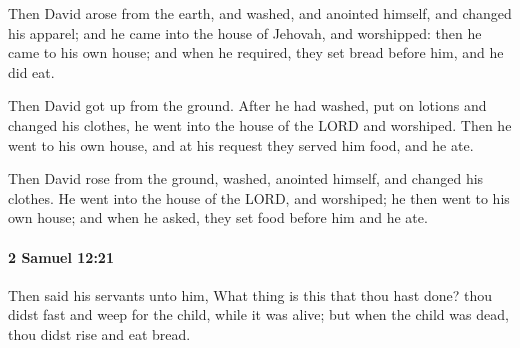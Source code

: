 			\begin{versebox}
					\item[BHS] 
					\item[ASV] Then David arose from the earth, and washed, and anointed himself, and changed his apparel; and he came into the house of Jehovah, and worshipped: then he came to his own house; and when he required, they set bread before him, and he did eat.
					\item[NIV] Then David got up from the ground. After he had washed, put on lotions and changed his clothes, he went into the house of the LORD and worshiped. Then he went to his own house, and at his request they served him food, and he ate.
					\item[NRSV] Then David rose from the ground, washed, anointed himself, and changed his clothes. He went into the house of the LORD, and worshiped; he then went to his own house; and when he asked, they set food before him and he ate.
			\end{versebox}

		\paragraph{2 Samuel 12:21} %
			\label{2SAMUEL-12-21}

			Then said his servants unto him, What thing is this that thou hast done? thou didst fast and weep for the child, while it was alive; but when the child was dead, thou didst rise and eat bread.

